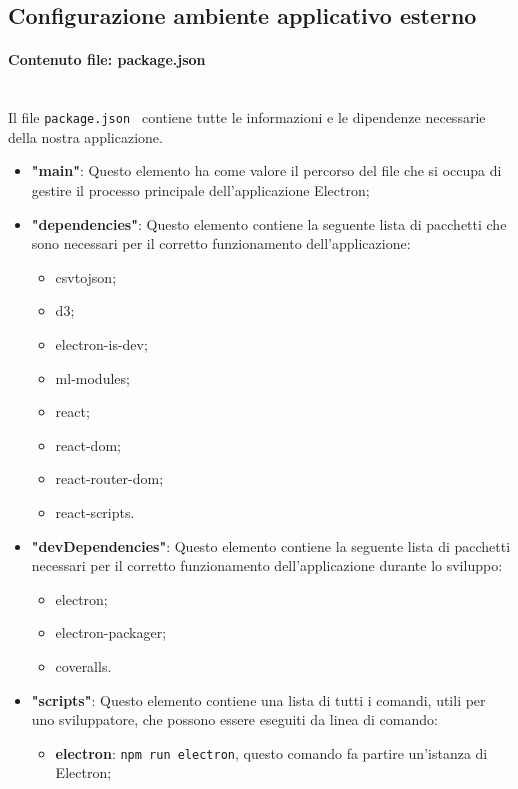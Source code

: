 \subsection{Configurazione ambiente applicativo esterno}
\paragraph{Contenuto file: package.json}\mbox{}\\ [1mm]
Il file \verb|package.json | contiene tutte le informazioni e le dipendenze necessarie della nostra applicazione.
\begin{itemize}
    \item \textbf{"main"}: Questo elemento ha come valore il percorso del file che si occupa di gestire il processo principale dell'applicazione Electron;
    \item \textbf{"dependencies"}: Questo elemento contiene la seguente lista di pacchetti che sono necessari per il corretto funzionamento dell'applicazione:
        \begin{itemize}
            \item csvtojson;
            \item d3;
            \item electron-is-dev;
            \item ml-modules;
            \item react;
            \item react-dom;
            \item react-router-dom;
            \item react-scripts.
        \end{itemize}
    \item \textbf{"devDependencies"}: Questo elemento contiene la seguente lista di pacchetti necessari per il corretto funzionamento dell'applicazione durante lo sviluppo:
        \begin{itemize}
            \item electron;
            \item electron-packager;
            \item coveralls.
        \end{itemize} 
    \item \textbf{"scripts"}: Questo elemento contiene una lista di tutti i comandi, utili per uno sviluppatore, che possono essere eseguiti da linea di comando:
        \begin{itemize}
            \item \textbf{electron}: \verb|npm run electron|, questo comando fa partire un'istanza di Electron;

\end{itemize}
\end{itemize}
